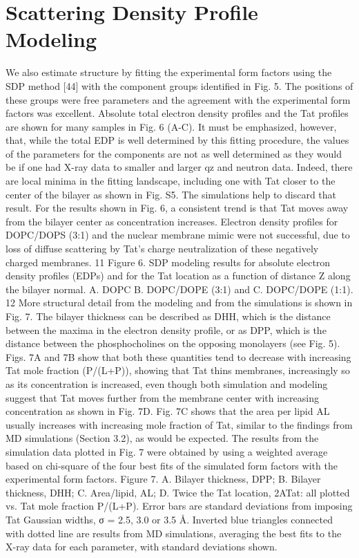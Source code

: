 \section{Scattering Density Profile Modeling}
We also estimate structure by fitting the experimental form factors using the SDP method
[44] with the component groups identified in Fig. 5. The positions of these groups were free
parameters and the agreement with the experimental form factors was excellent. Absolute total
electron density profiles and the Tat profiles are shown for many samples in Fig. 6 (A-C). It
must be emphasized, however, that, while the total EDP is well determined by this fitting
procedure, the values of the parameters for the components are not as well determined as they
would be if one had X-ray data to smaller and larger qz and neutron data. Indeed, there are local
minima in the fitting landscape, including one with Tat closer to the center of the bilayer as
shown in Fig. S5. The simulations help to discard that result. For the results shown in Fig. 6, a
consistent trend is that Tat moves away from the bilayer center as concentration increases.
Electron density profiles for DOPC/DOPS (3:1) and the nuclear membrane mimic were not
successful, due to loss of diffuse scattering by Tat’s charge neutralization of these negatively
charged membranes.
11
Figure 6. SDP modeling results for
absolute electron density profiles
(EDPs) and for the Tat location as a
function of distance Z along the
bilayer normal. A. DOPC B.
DOPC/DOPE (3:1) and C.
DOPC/DOPE (1:1).
12
More structural detail from the modeling and from the simulations is shown in Fig. 7. The
bilayer thickness can be described as DHH, which is the distance between the maxima in the
electron density profile, or as DPP, which is the distance between the phosphocholines on the
opposing monolayers (see Fig. 5). Figs. 7A and 7B show that both these quantities tend to
decrease with increasing Tat mole fraction (P/(L+P)), showing that Tat thins membranes,
increasingly so as its concentration is increased, even though both simulation and modeling
suggest that Tat moves further from the membrane center with increasing concentration as
shown in Fig. 7D. Fig. 7C shows that the area per lipid AL usually increases with increasing
mole fraction of Tat, similar to the findings from MD simulations (Section 3.2), as would be
expected. The results from the simulation data plotted in Fig. 7 were obtained by using a
weighted average based on chi-square of the four best fits of the simulated form factors with the
experimental form factors.
Figure 7. A. Bilayer thickness, DPP; B. Bilayer thickness, DHH; C. Area/lipid, AL; D. Twice the
Tat location, 2ATat: all plotted vs. Tat mole fraction P/(L+P). Error bars are standard deviations
from imposing Tat Gaussian widths, σ = 2.5, 3.0 or 3.5 Å. Inverted blue triangles connected
with dotted line are results from MD simulations, averaging the best fits to the X-ray data for
each parameter, with standard deviations shown.

